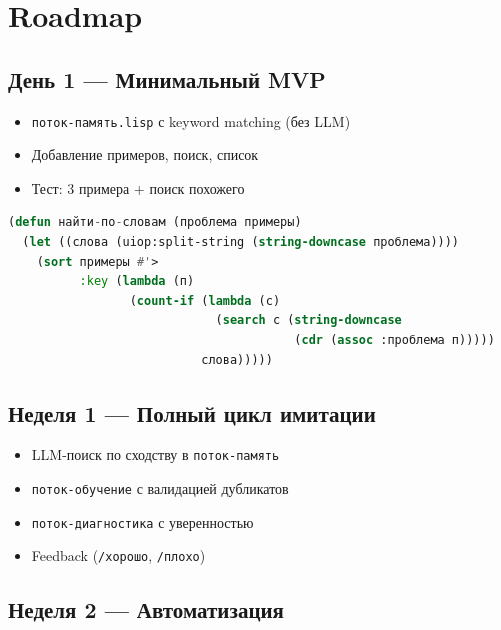 \documentclass[12pt, a4paper, twoside]{article}
\begin{document}
\section{Roadmap}

\subsection{День 1 --- Минимальный MVP}

\begin{itemize}[leftmargin=1.5em]
  \item[\checkmark] \texttt{поток-память.lisp} с keyword matching (без LLM)
  \item[\checkmark] Добавление примеров, поиск, список
  \item[\checkmark] Тест: 3 примера + поиск похожего
\end{itemize}

\begin{lstlisting}[language=CommonLisp,caption={Поиск по словам без LLM для быстрого старта}]
(defun найти-по-словам (проблема примеры)
  (let ((слова (uiop:split-string (string-downcase проблема))))
    (sort примеры #'>
          :key (lambda (п)
                 (count-if (lambda (с)
                             (search с (string-downcase
                                        (cdr (assoc :проблема п)))))
                           слова)))))
\end{lstlisting}

\subsection{Неделя 1 --- Полный цикл имитации}

\begin{itemize}[leftmargin=1.5em]
  \item LLM-поиск по сходству в \texttt{поток-память}
  \item \texttt{поток-обучение} с валидацией дубликатов
  \item \texttt{поток-диагностика} с уверенностью
  \item Feedback (\texttt{/хорошо}, \texttt{/плохо})
\end{itemize}

\subsection{Неделя 2 --- Автоматизация}
\end{document}
